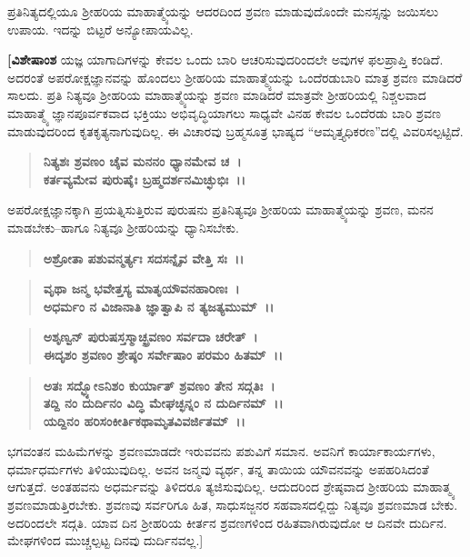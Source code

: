 ಪ್ರತಿನಿತ್ಯದಲ್ಲಿಯೂ ಶ‍್ರೀಹರಿಯ ಮಾಹಾತ್ಮ್ಯೆಯನ್ನು ಆದರದಿಂದ ಶ್ರವಣ ಮಾಡುವುದೊಂದೇ ಮನಸ್ಸನ್ನು ಜಯಿಸಲು ಉಪಾಯ. ಇದನ್ನು ಬಿಟ್ಟರೆ ಅನ್ಯೋಪಾಯವಿಲ್ಲ.

\textbf{[ವಿಶೇಷಾಂಶ} ಯಜ್ಞ ಯಾಗಾದಿಗಳನ್ನು ಕೇವಲ ಒಂದು ಬಾರಿ ಆಚರಿಸುವುದರಿಂದಲೇ ಅವುಗಳ ಫಲಪ್ರಾಪ್ತಿ ಕಂಡಿದೆ. ಅದರಂತೆ ಅಪರೋಕ್ಷಜ್ಞಾನವನ್ನು ಹೊಂದಲು ಶ‍್ರೀಹರಿಯ ಮಾಹಾತ್ಮ್ಯೆಯನ್ನು ಒಂದೆರಡುಬಾರಿ ಮಾತ್ರ ಶ್ರವಣ ಮಾಡಿದರೆ ಸಾಲದು. ಪ್ರತಿ ನಿತ್ಯವೂ ಶ‍್ರೀಹರಿಯ ಮಾಹಾತ್ಮ್ಯೆಯನ್ನು ಶ್ರವಣ ಮಾಡಿದರೆ ಮಾತ್ರವೇ ಶ‍್ರೀಹರಿಯಲ್ಲಿ ನಿಶ್ಚಲವಾದ ಮಾಹಾತ್ಮ್ಯೆ ಜ್ಞಾನಪೂರ್ವಕವಾದ ಭಕ್ತಿಯು ಅಭಿವೃದ್ಧಿಯಾಗಲು ಸಾಧ್ಯವೇ ವಿನಹ ಕೇವಲ ಒಂದೆರಡು ಬಾರಿ ಶ್ರವಣ ಮಾಡುವುದರಿಂದ ಕೃತಕೃತ್ಯನಾಗುವುದಿಲ್ಲ. ಈ ವಿಚಾರವು ಬ್ರಹ್ಮಸೂತ್ರ ಭಾಷ್ಯದ “ಆಮೃತ್ತ್ಯಧಿಕರಣ”ದಲ್ಲಿ ವಿವರಿಸಲ್ಪಟ್ಟಿದೆ.

\begin{verse}
\textbf{ನಿತ್ಯಶಃ ಶ್ರವಣಂ ಚೈವ ಮನನಂ ಧ್ಯಾನಮೇವ ಚ~।}\\\textbf{ಕರ್ತವ್ಯಮೇವ ಪುರುಷೈಃ ಬ್ರಹ್ಮದರ್ಶನಮಿಚ್ಛುಭಿಃ~।।} 
\end{verse}

ಅಪರೋಕ್ಷಜ್ಞಾನಕ್ಕಾಗಿ ಪ್ರಯತ್ನಿಸುತ್ತಿರುವ ಪುರುಷನು ಪ್ರತಿನಿತ್ಯವೂ ಶ‍್ರೀಹರಿಯ ಮಾಹಾತ್ಮ್ಯೆಯನ್ನು ಶ್ರವಣ, ಮನನ ಮಾಡಬೇಕು–ಹಾಗೂ ನಿತ್ಯವೂ ಶ‍್ರೀಹರಿಯನ್ನು ಧ್ಯಾನಿಸಬೇಕು.

\newpage

\begin{verse}
\textbf{ಅಶ್ರೋತಾ ಪಶುವನ್ಮರ್ತ್ಯಃ ಸದಸನ್ನೈವ ವೇತ್ತಿ ಸಃ~।।} 
\end{verse}

\begin{verse}
\textbf{ವೃಥಾ ಜನ್ಮ ಭವೇತ್ತಸ್ಯ ಮಾತೃಯೌವನಹಾರಿಣಃ~।}\\\textbf{ಅಧರ್ಮಂ ನ ವಿಜಾನಾತಿ ಜ್ಞಾತ್ವಾಪಿ ನ ತ್ಯಜತ್ಯಮುಮ್~।। }
\end{verse}

\begin{verse}
\textbf{ಅಶೃಣ್ವನ್ ಪುರುಷಸ್ತಸ್ಮಾಚ್ಛ್ರವಣಂ ಸರ್ವದಾ ಚರೇತ್~।}\\\textbf{ಈದೃಶಂ ಶ್ರವಣಂ ಶ್ರೇಷ್ಠಂ ಸರ್ವೇಷಾಂ ಪರಮಂ ಹಿತಮ್~।। }
\end{verse}

\begin{verse}
\textbf{ಅತಃ ಸದ್ಭ್ಯೋಽನಿಶಂ ಕುರ್ಯಾತ್ ಶ್ರವಣಂ ತೇನ ಸದ್ಗತಿಃ~।}\\\textbf{ತದ್ದಿ ನಂ ದುರ್ದಿನಂ ವಿದ್ಧಿ ಮೇಘಚ್ಛನ್ನಂ ನ ದುರ್ದಿನಮ್~।। }\\\textbf{ಯದ್ದಿನಂ ಹರಿಸಂಕೀರ್ತಿಕಥಾಮೃತವಿವರ್ಜಿತಮ್~।।} 
\end{verse}

ಭಗವಂತನ ಮಹಿಮೆಗಳನ್ನು ಶ್ರವಣಮಾಡದೇ ಇರುವವನು ಪಶುವಿಗೆ ಸಮಾನ. ಅವನಿಗೆ ಕಾರ್ಯಾಕಾರ್ಯಗಳು, ಧರ್ಮಾಧರ್ಮಗಳು ತಿಳಿಯುವುದಿಲ್ಲ. ಅವನ ಜನ್ಮವು ವ್ಯರ್ಥ, ತನ್ನ ತಾಯಿಯ ಯೌವನವನ್ನು ಅಪಹರಿಸಿದಂತೆ ಆಗುತ್ತದೆ. ಅಂತಹವನು ಅಧರ್ಮವನ್ನು ತಿಳಿದರೂ ತ್ಯಜಿಸುವುದಿಲ್ಲ. ಆದುದರಿಂದ ಶ್ರೇಷ್ಠವಾದ ಶ‍್ರೀಹರಿಯ ಮಾಹಾತ್ಮ್ಯ ಶ್ರವಣಮಾಡುತ್ತಿರಬೇಕು. ಶ್ರವಣವು ಸರ್ವರಿಗೂ ಹಿತ, ಸಾಧುಸಜ್ಜನರ ಸಹವಾಸದಲ್ಲಿದ್ದು ನಿತ್ಯವೂ ಶ್ರವಣಮಾಡ ಬೇಕು. ಅದರಿಂದಲೇ ಸದ್ಗತಿ. ಯಾವ ದಿನ ಶ‍್ರೀಹರಿಯ ಕೀರ್ತನ ಶ್ರವಣಗಳಿಂದ ರಹಿತವಾಗಿರುವುದೋ ಆ ದಿನವೇ ದುರ್ದಿನ. ಮೇಘಗಳಿಂದ ಮುಚ್ಚಲ್ಪಟ್ಟ ದಿನವು ದುರ್ದಿನವಲ್ಲ.]

